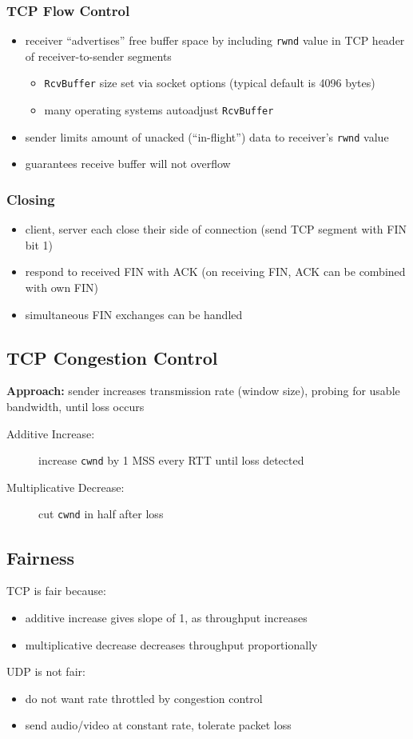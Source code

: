 \subsubsection{TCP Flow Control}
\begin{itemize}
	\item receiver ``advertises'' free buffer space by including \texttt{rwnd} value in TCP header of receiver-to-sender segments
	\begin{itemize}
		\item \texttt{RcvBuffer} size set via socket options (typical default is 4096 bytes)
		\item many operating systems autoadjust \texttt{RcvBuffer}
	\end{itemize}
	\item sender limits amount of unacked (``in-flight'') data to receiver's \texttt{rwnd} value
	\item guarantees receive buffer will not overflow
\end{itemize}
\subsubsection{Closing}
\begin{itemize}
	\item client, server each close their side of connection (send TCP segment with FIN bit 1)
	\item respond to received FIN with ACK (on receiving FIN, ACK can be combined with own FIN)
	\item simultaneous FIN exchanges can be handled
\end{itemize}

\subsection{TCP Congestion Control}
\textbf{Approach:} sender increases transmission rate (window size), probing for usable bandwidth, until loss occurs
\begin{description}
	\item[Additive Increase:] increase \texttt{cwnd} by 1 MSS every RTT until loss detected
	\item[Multiplicative Decrease:] cut \texttt{cwnd} in half after loss
\end{description}

\subsection{Fairness}
TCP is fair because:
\begin{itemize}
	\item additive increase gives slope of 1, as throughput increases
	\item multiplicative decrease decreases throughput proportionally
\end{itemize}
UDP is not fair:
\begin{itemize}
	\item do not want rate throttled by congestion control
	\item send audio/video at constant rate, tolerate packet loss
\end{itemize}

